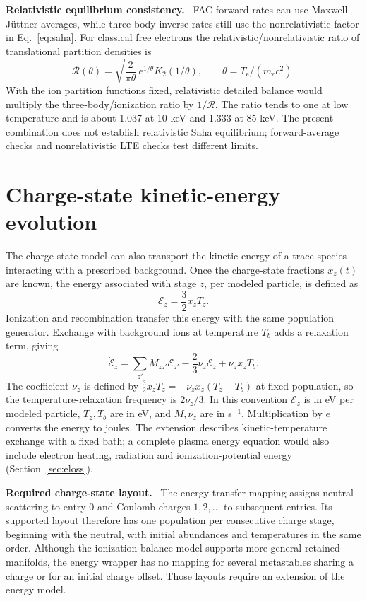 \documentclass[11pt,a4paper]{article}
\newcommand{\Te}{T_{\mathrm e}}
\newenvironment{caveat}[1][Caveat]{%
  \par\smallskip\noindent\begin{lrbox}{\notebox}\setlength{\fboxsep}{6pt}\begin{minipage}{\dimexpr\linewidth-2\fboxsep-2\fboxrule\relax}\small\textbf{#1.}\ }{%
  \end{minipage}\end{lrbox}\setlength{\fboxsep}{6pt}\fcolorbox{warnframe}{warnbg}{\usebox{\notebox}}\par\smallskip}
\numberwithin{equation}{section}
\begin{document}
\begin{caveat}[Relativistic equilibrium consistency]
FAC forward rates can use Maxwell--J\"uttner averages, while three-body
inverse rates still use the nonrelativistic factor in Eq.~\eqref{eq:saha}.
For classical free electrons the relativistic/nonrelativistic ratio
of translational partition densities is
\[
 \mathcal R(\theta)=\sqrt{\frac{2}{\pi\theta}}\,
       e^{1/\theta}K_2(1/\theta),\qquad \theta=\Te/(m_ec^2).
\]
With the ion partition functions fixed, relativistic detailed balance
would multiply the three-body/ionization ratio by $1/\mathcal R$.
The ratio tends to one at low temperature and is about 1.037 at 10 keV
and 1.333 at 85 keV. The present combination does not establish
relativistic Saha equilibrium; forward-average checks and
nonrelativistic LTE checks test different limits.
\end{caveat}

\section{Charge-state kinetic-energy evolution}\label{sec:energy}

The charge-state model can also transport the kinetic energy of a
trace species interacting with a prescribed background. Once the
charge-state fractions $x_z(t)$ are known, the energy associated
with stage $z$, per modeled particle, is defined as
\begin{equation}
 \mathcal E_z=\frac32x_zT_z.
\end{equation}
Ionization and recombination transfer this energy with the same
population generator. Exchange with background ions at temperature
$T_b$ adds a relaxation term, giving
\begin{equation}\label{eq:energy}
 \dot{\mathcal E}_z=\sum_{z'}M_{zz'}\mathcal E_{z'}
      -\frac23\nu_z\mathcal E_z+\nu_zx_zT_b.
\end{equation}
The coefficient $\nu_z$ is defined by
$\tfrac32x_z\dot T_z=-\nu_zx_z(T_z-T_b)$ at fixed population, so
the temperature-relaxation frequency is $2\nu_z/3$. In this convention
$\mathcal E_z$ is in eV per modeled particle, $T_z,T_b$ are in eV,
and $M,\nu_z$ are in s$^{-1}$. Multiplication by $e$ converts the
energy to joules. The extension describes kinetic-temperature
exchange with a fixed bath; a complete plasma energy equation would
also include electron heating, radiation and ionization-potential
energy (Section~\ref{sec:eloss}).

\begin{caveat}[Required charge-state layout]
The energy-transfer mapping assigns neutral scattering to entry 0
and Coulomb charges $1,2,\ldots$ to subsequent entries. Its supported
layout therefore has one population per consecutive charge stage,
beginning with the neutral, with initial abundances and temperatures
in the same order. Although the ionization-balance model supports
more general retained manifolds, the energy wrapper has no mapping
for several metastables sharing a charge or for an initial charge
offset. Those layouts require an extension of the energy model.
\end{caveat}
\end{document}
